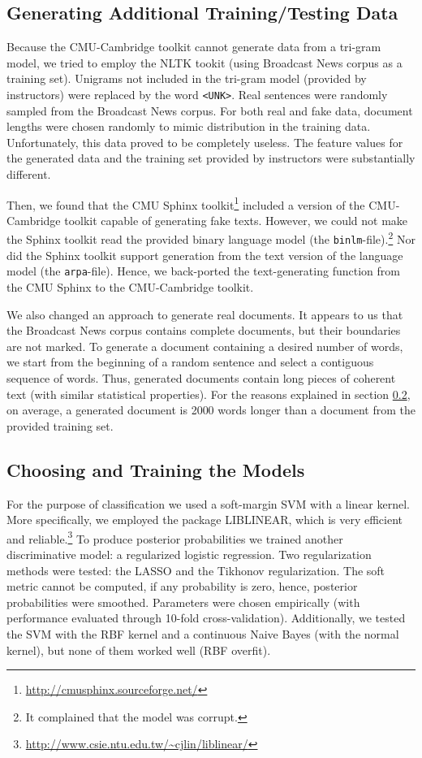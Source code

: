 \documentclass[11pt]{article}
\begin{document}
\subsection{Generating Additional Training/Testing Data}\label{SectGen}
Because the CMU-Cambridge toolkit cannot generate data from a tri-gram model,
we tried to employ the NLTK tookit (using Broadcast News corpus as a training set).
Unigrams not included in the tri-gram model (provided by instructors) were replaced by the word \texttt{<UNK>}.
Real sentences were randomly sampled from the Broadcast News corpus.
For both real and fake data, document lengths were chosen randomly to mimic distribution in the training data.
Unfortunately, this data proved to be completely useless. The feature values for the generated data
and the training set provided by instructors were substantially different.

Then, we found that the CMU Sphinx toolkit\footnote{\url{http://cmusphinx.sourceforge.net/}}
included a version of the CMU-Cambridge toolkit capable of generating fake texts.
However, we could not make the Sphinx toolkit read the provided binary language model (the \texttt{binlm}-file).\footnote{It complained that the model was corrupt.} Nor did the Sphinx toolkit
support generation from the text version of the language model (the \texttt{arpa}-file).
Hence, we back-ported the text-generating function from the CMU Sphinx to the CMU-Cambridge toolkit.

We also changed an approach to generate real documents.
It appears to us that the Broadcast News corpus contains complete documents, but their boundaries are not marked.
To generate a document containing a desired number of
words, we start from the beginning of a random sentence and select a contiguous sequence
of words. Thus, generated documents contain long pieces of coherent text (with similar statistical properties).
For the reasons explained in section \ref{SectTrain}, on average, a generated document is
2000 words longer than  a document from the provided training set.

\subsection{Choosing and Training the Models}\label{SectTrain}
For the purpose of classification we used a soft-margin SVM with a linear kernel. 
More specifically, we employed the package LIBLINEAR,
which is very efficient and reliable.\footnote{\url{http://www.csie.ntu.edu.tw/~cjlin/liblinear/}}
To produce posterior probabilities we trained another discriminative model: a
regularized logistic regression.
Two regularization methods were tested: the LASSO and the Tikhonov regularization.
The soft metric cannot be computed, if any probability is zero,
hence, posterior probabilities were smoothed.
Parameters were chosen empirically (with performance evaluated through 10-fold cross-validation).
Additionally, we tested the SVM with the RBF kernel and a continuous Naive Bayes (with the normal kernel),
but none of them worked well (RBF overfit).
\end{document}
